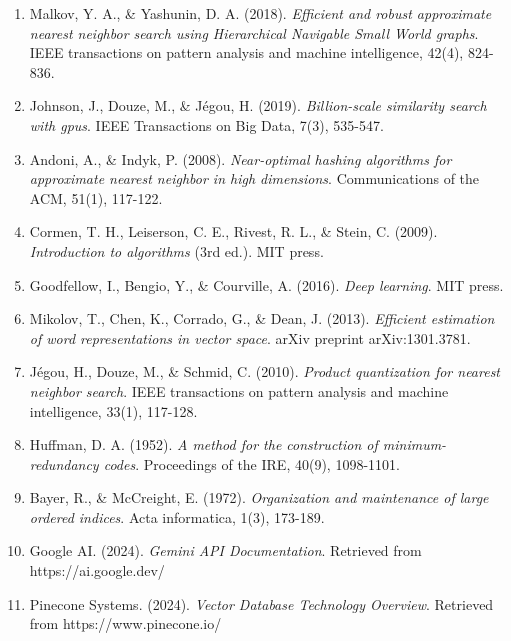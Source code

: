 \documentclass[12pt,a4paper]{article}
\begin{document}
\begin{enumerate}
    \item Malkov, Y. A., \& Yashunin, D. A. (2018). \textit{Efficient and robust approximate nearest neighbor search using Hierarchical Navigable Small World graphs}. IEEE transactions on pattern analysis and machine intelligence, 42(4), 824-836.
    
    \item Johnson, J., Douze, M., \& Jégou, H. (2019). \textit{Billion-scale similarity search with gpus}. IEEE Transactions on Big Data, 7(3), 535-547.
    
    \item Andoni, A., \& Indyk, P. (2008). \textit{Near-optimal hashing algorithms for approximate nearest neighbor in high dimensions}. Communications of the ACM, 51(1), 117-122.
    
    \item Cormen, T. H., Leiserson, C. E., Rivest, R. L., \& Stein, C. (2009). \textit{Introduction to algorithms} (3rd ed.). MIT press.
    
    \item Goodfellow, I., Bengio, Y., \& Courville, A. (2016). \textit{Deep learning}. MIT press.
    
    \item Mikolov, T., Chen, K., Corrado, G., \& Dean, J. (2013). \textit{Efficient estimation of word representations in vector space}. arXiv preprint arXiv:1301.3781.
    
    \item Jégou, H., Douze, M., \& Schmid, C. (2010). \textit{Product quantization for nearest neighbor search}. IEEE transactions on pattern analysis and machine intelligence, 33(1), 117-128.
    
    \item Huffman, D. A. (1952). \textit{A method for the construction of minimum-redundancy codes}. Proceedings of the IRE, 40(9), 1098-1101.
    
    \item Bayer, R., \& McCreight, E. (1972). \textit{Organization and maintenance of large ordered indices}. Acta informatica, 1(3), 173-189.
    
    \item Google AI. (2024). \textit{Gemini API Documentation}. Retrieved from https://ai.google.dev/
    
    \item Pinecone Systems. (2024). \textit{Vector Database Technology Overview}. Retrieved from https://www.pinecone.io/
    

\end{enumerate}
\end{document}
